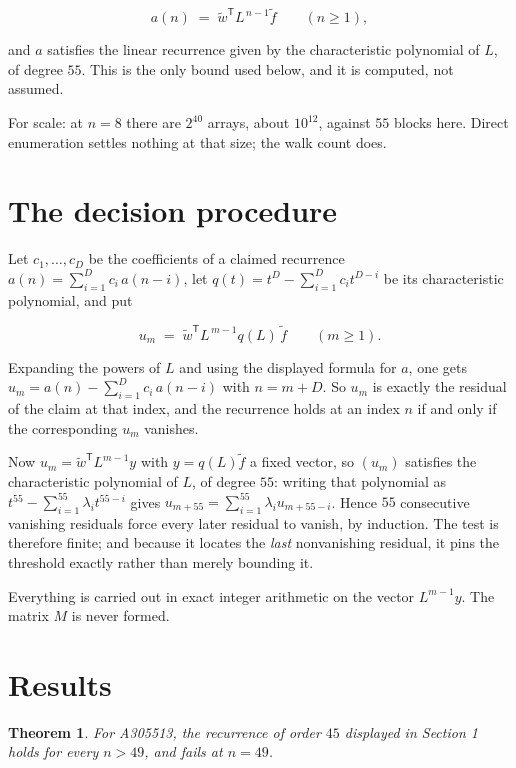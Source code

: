 \documentclass[11pt]{article}
\newtheorem{theorem}{Theorem}
\theoremstyle{definition}
\begin{document}
\[a(n) \;=\; \tilde w^{\mathsf T} L^{\,n-1} \tilde f \qquad (n \ge 1),\]

and $a$ satisfies the linear recurrence given by the characteristic polynomial of $L$, of degree $55$. This is the only bound used below, and it is computed, not assumed.

For scale: at $n = 8$ there are $2^{40}$ arrays, about $10^{12}$, against $55$ blocks here. Direct enumeration settles nothing at that size; the walk count does.

\section{The decision procedure}

Let $c_1,\dots,c_D$ be the coefficients of a claimed recurrence $a(n) = \sum_{i=1}^{D} c_i\,a(n-i)$, let $q(t) = t^{D} - \sum_{i=1}^{D} c_i t^{D-i}$ be its characteristic polynomial, and put

\[u_m \;=\; \tilde w^{\mathsf T} L^{\,m-1} q(L)\,\tilde f \qquad (m \ge 1).\]

Expanding the powers of $L$ and using the displayed formula for $a$, one gets $u_m = a(n) - \sum_{i=1}^{D} c_i\,a(n-i)$ with $n = m + D$. So $u_m$ is exactly the residual of the claim at that index, and the recurrence holds at an index $n$ if and only if the corresponding $u_m$ vanishes.

Now $u_m = \tilde w^{\mathsf T} L^{m-1} y$ with $y = q(L)\tilde f$ a fixed vector, so $(u_m)$ satisfies the characteristic polynomial of $L$, of degree $55$: writing that polynomial as $t^{55} - \sum_{i=1}^{55} \lambda_i t^{55-i}$ gives $u_{m+55} = \sum_{i=1}^{55} \lambda_i u_{m+55-i}$. Hence $55$ consecutive vanishing residuals force every later residual to vanish, by induction. The test is therefore finite; and because it locates the {\itshape last} nonvanishing residual, it pins the threshold exactly rather than merely bounding it.

Everything is carried out in exact integer arithmetic on the vector $L^{m-1}y$. The matrix $M$ is never formed.

\section{Results}

\begin{theorem} For A305513, the recurrence of order $45$ displayed in Section 1 holds for every $n > 49$, and fails at $n = 49$.\end{theorem}
\end{document}
